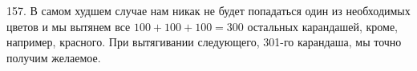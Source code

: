 157. В самом худшем случае нам никак не будет попадаться один из необходимых цветов и мы вытянем все $100+100+100=300$ остальных карандашей, кроме, например, красного. При вытягивании следующего, 301-го карандаша, мы точно получим желаемое.\\
